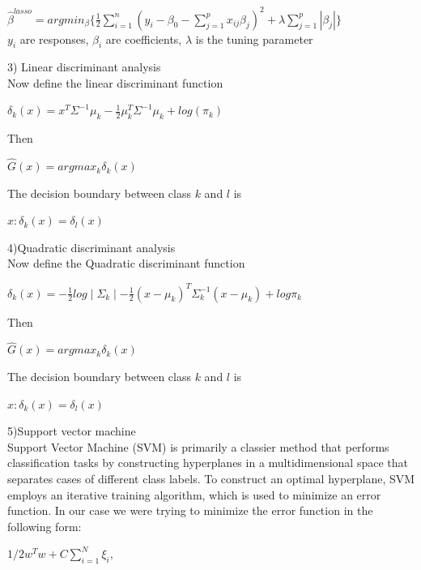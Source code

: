 \documentclass[11pt]{article}
\begin{document}
\begin{center}
$\hat{\beta}^{lasso}=argmin_\beta\{\frac{1}{2}\sum_{i=1}^{n} (y_i-\beta_0-\sum_{j=1}^{p}x_{ij}\beta_j)^2+\lambda\sum_{j=1}^{p}\left|\beta_j\right|\}$\vspace{1.5ex}\\
$y_i$ are responses, $\beta_i$ are coefficients, $\lambda$ is the tuning parameter\vspace{1.5ex}\\
\end{center}
3) Linear discriminant analysis\\
Now define the linear discriminant function\\
\begin{center}
$\delta_k(x)=x^T\Sigma^{-1}\mu_k-\frac{1}{2}\mu_k^T\Sigma^{-1}\mu_k+log(\pi_k)$\\
\end{center}
Then
\begin{center}
$\hat{G}(x)=argmax_k\delta_k(x)$\\
\end{center}
The decision boundary between class $k$ and $l$ is \\
\begin{center}
${x:\delta_k(x)=\delta_l(x)}$
\end{center}
4)Quadratic discriminant analysis\\
Now define the Quadratic discriminant function
\begin{center}
$\delta_k(x)=-\frac{1}{2}log\mid \Sigma_k\mid-\frac{1}{2}(x-\mu_k)^T\Sigma_k^{-1}(x-\mu_k)+log\pi_k$\\
\end{center}
Then
\begin{center}
$\hat{G}(x)=argmax_k\delta_k(x)$
\end{center}
The decision boundary between class $k$ and $l$ is 
\begin{center}
${x:\delta_k(x)=\delta_l(x)}$
\end{center}
5)Support vector machine\\
Support Vector Machine (SVM) is primarily a classier method that performs classification tasks by constructing hyperplanes in a multidimensional space that separates cases of different class labels. To construct an optimal hyperplane, SVM employs an iterative training algorithm, which is used to minimize an error function. In our case we were trying to minimize the error function in the following form:
\begin{center}
$1/2w^Tw+C\sum_{i=1}^{N} \xi_i$,
\end{center} 
\end{document}
